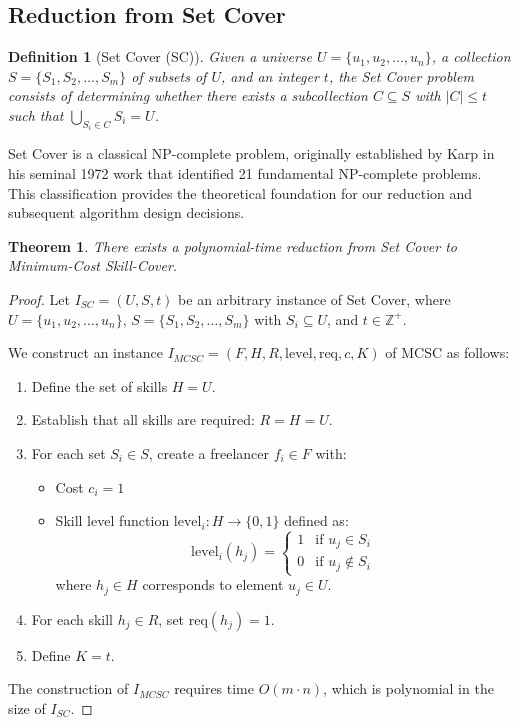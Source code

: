 \documentclass[12pt,a4paper]{article}
\newtheorem{theorem}{Theorem}[section]
\newtheorem{definition}{Definition}[section]
\newtheorem{proof}{Proof}
\begin{document}
\subsection{Reduction from Set Cover}
\label{subsec:reduction-setcover}

\begin{definition}[Set Cover (SC)]
	Given a universe $U = \{u_1, u_2, \ldots, u_n\}$, a collection $S = \{S_1, S_2, \ldots, S_m\}$ of subsets of $U$, and an integer $t$, the Set Cover problem consists of determining whether there exists a subcollection $C \subseteq S$ with $|C| \leq t$ such that $\bigcup_{S_i \in C} S_i = U$.
\end{definition}

Set Cover is a classical NP-complete problem, originally established by Karp in his seminal 1972 work \cite{setcover} that identified 21 fundamental NP-complete problems. This classification provides the theoretical foundation for our reduction and subsequent algorithm design decisions.

\begin{theorem}
	There exists a polynomial-time reduction from Set Cover to Minimum-Cost Skill-Cover.
\end{theorem}

\begin{proof}
	Let $I_{SC} = (U, S, t)$ be an arbitrary instance of Set Cover, where $U = \{u_1, u_2, \ldots, u_n\}$, $S = \{S_1, S_2, \ldots, S_m\}$ with $S_i \subseteq U$, and $t \in \mathbb{Z}^+$.
	
	We construct an instance $I_{MCSC} = (F, H, R, \text{level}, \text{req}, c, K)$ of MCSC as follows:
	
	\begin{enumerate}
		\item Define the set of skills $H = U$.
		\item Establish that all skills are required: $R = H = U$.
		\item For each set $S_i \in S$, create a freelancer $f_i \in F$ with:
		\begin{itemize}
			\item Cost $c_i = 1$
			\item Skill level function $\text{level}_i: H \rightarrow \{0, 1\}$ defined as:
			\[
			\text{level}_i(h_j) = 
			\begin{cases} 
				1 & \text{if } u_j \in S_i \\
				0 & \text{if } u_j \notin S_i
			\end{cases}
			\]
			where $h_j \in H$ corresponds to element $u_j \in U$.
		\end{itemize}
		\item For each skill $h_j \in R$, set $\text{req}(h_j) = 1$.
		\item Define $K = t$.
	\end{enumerate}
	
	The construction of $I_{MCSC}$ requires time $O(m \cdot n)$, which is polynomial in the size of $I_{SC}$.
\end{proof}
\end{document}
